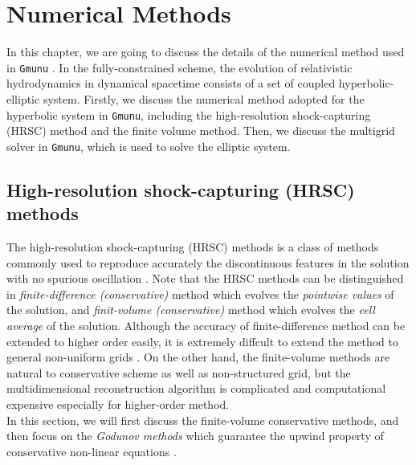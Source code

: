 
\chapter{Numerical Methods}  %

\ifpdf
    \graphicspath{{Chapter3/Figs/PDF/}{Chapter3/Figs/}}
\else
    \graphicspath{{Chapter3/Figs/}}
\fi

In this chapter, we are going to discuss the details of the numerical method used in \texttt{Gmunu} \cite{cheong2020gmunu,cheong2020gmunu_amr}.
In the fully-constrained scheme, the evolution of relativistic hydrodynamics in dynamical spacetime
consists of a set of coupled hyperbolic-elliptic system.
Firstly, we discuss the numerical method adopted for the hyperbolic system in \texttt{Gmunu},
including the high-resolution shock-capturing (HRSC) method and the finite volume method.
Then, we discuss the multigrid solver in \texttt{Gmunu},
which is used to solve the elliptic system.

\section{High-resolution shock-capturing (HRSC) methods}
The high-resolution shock-capturing (HRSC) methods is a class of methods commonly used to
reproduce accurately the discontinuous features in the solution
with no spurious oscillation \cite{harten1997high}.
Note that the HRSC methods can be distinguished in \textit{finite-difference (conservative)} method
which evolves the \textit{pointwise values} of the solution,
and \textit{finit-volume (conservative)} method which evolves the \textit{cell average} of the solution.
Although the accuracy of finite-difference method can be extended to higher order easily,
it is extremely diffcult to extend the method to general non-uniform grids \cite{merriman2003understanding}.
On the other hand,
the finite-volume methods are natural to conservative scheme as well as non-structured grid,
but the multidimensional reconstruction algorithm is complicated and computational expensive especially for higher-order method.\\
In this section,
we will first discuss the finite-volume conservative methods,
and then focus on the \textit{Godunov methods} which guarantee the upwind property of conservative non-linear equations \cite{van1999introduction}.

